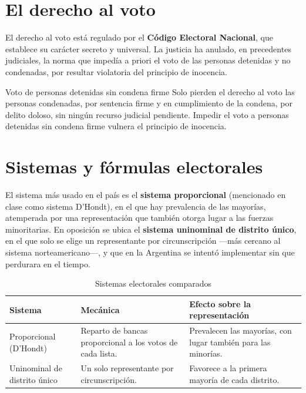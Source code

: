 \documentclass[12pt,oneside]{book}
\begin{document}
\section{El derecho al voto}

El derecho al voto está regulado por el \textbf{Código Electoral Nacional}, que establece su carácter secreto y universal. La justicia ha anulado, en precedentes judiciales, la norma que impedía a priori el voto de las personas detenidas y no condenadas, por resultar violatoria del principio de inocencia.

\begin{definition}{Voto de personas detenidas sin condena firme}
Solo pierden el derecho al voto las personas condenadas, por sentencia firme y en cumplimiento de la condena, por delito doloso, sin ningún recurso judicial pendiente. Impedir el voto a personas detenidas sin condena firme vulnera el principio de inocencia.
\end{definition}

\section{Sistemas y fórmulas electorales}

El sistema más usado en el país es el \textbf{sistema proporcional} (mencionado en clase como sistema D'Hondt), en el que hay prevalencia de las mayorías, atemperada por una representación que también otorga lugar a las fuerzas minoritarias. En oposición se ubica el \textbf{sistema uninominal de distrito único}, en el que solo se elige un representante por circunscripción ---más cercano al sistema norteamericano---, y que en la Argentina se intentó implementar sin que perdurara en el tiempo.

\begin{table}[H]
\centering
\caption{Sistemas electorales comparados}
\begin{tabularx}{\textwidth}{Q{0.28\textwidth}YY}
\toprule
\textbf{Sistema} & \textbf{Mecánica} & \textbf{Efecto sobre la representación} \\
\midrule
Proporcional (D'Hondt) & Reparto de bancas proporcional a los votos de cada lista. & Prevalecen las mayorías, con lugar también para las minorías. \\
Uninominal de distrito único & Un solo representante por circunscripción. & Favorece a la primera mayoría de cada distrito. \\
\bottomrule
\end{tabularx}
\end{table}
\end{document}
